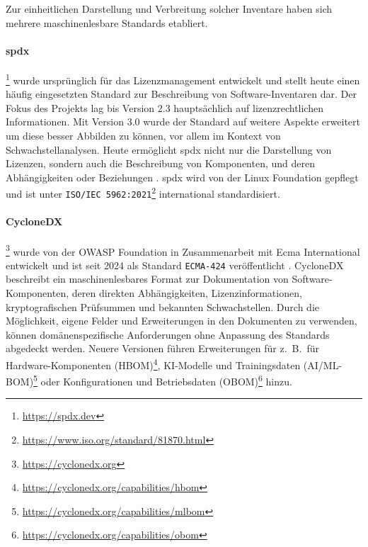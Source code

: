 Zur einheitlichen Darstellung und Verbreitung solcher Inventare haben sich mehrere maschinenlesbare Standards etabliert.


\paragraph{\acrfull{spdx}}\footnote{\url{https://spdx.dev}}
wurde ursprünglich für das Lizenzmanagement entwickelt und stellt heute einen häufig eingesetzten Standard zur Beschreibung von Software-Inventaren dar.
Der Fokus des Projekts lag bis Version 2.3 hauptsächlich auf lizenzrechtlichen Informationen.
Mit Version 3.0 wurde der Standard auf weitere Aspekte erweitert um diese besser Abbilden zu können, vor allem im Kontext von Schwachstellanalysen.
Heute ermöglicht \acrshort{spdx} nicht nur die Darstellung von Lizenzen, sondern auch die Beschreibung von Komponenten, und deren Abhängigkeiten oder Beziehungen \autocite{spdxOverview1june2024}.
\acrshort{spdx} wird von der Linux Foundation gepflegt und ist unter \texttt{ISO/IEC 5962:2021}\footnote{\url{https://www.iso.org/standard/81870.html}} international standardisiert.

\paragraph{CycloneDX}\footnote{\url{https://cyclonedx.org}}
wurde von der OWASP Foundation in Zusammenarbeit mit Ecma International entwickelt und ist seit 2024 als Standard \texttt{ECMA-424} veröffentlicht \autocite{CycloneDX2024Spec, ecma424:2024}.
CycloneDX beschreibt ein maschinenlesbares Format zur Dokumentation von Software-Komponenten, deren direkten Abhängigkeiten, Lizenzinformationen, kryptografischen Prüfsummen und bekannten Schwachstellen.
Durch die Möglichkeit, eigene Felder und Erweiterungen in den Dokumenten zu verwenden, können domänenspezifische Anforderungen ohne Anpassung des Standards abgedeckt werden.
Neuere Versionen führen Erweiterungen für z.\ B.\ für Hardware-Komponenten (HBOM)\footnote{\url{https://cyclonedx.org/capabilities/hbom}}, KI-Modelle und Trainingsdaten (AI/ML-BOM)\footnote{\url{https://cyclonedx.org/capabilities/mlbom}} oder Konfigurationen und Betriebsdaten (OBOM)\footnote{\url{https://cyclonedx.org/capabilities/obom}} hinzu.


